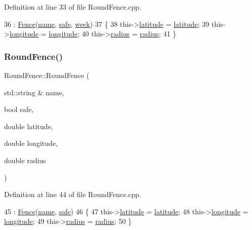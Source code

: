 Definition at line 33 of file Round\+Fence.\+cpp.


\begin{DoxyCode}
36         : \hyperlink{class_fence_a5c2be718e885ed9ae2ca048406d126b3}{Fence}(\hyperlink{class_fence_aa405676733f25812b38ea0dd9ccd1863}{name}, \hyperlink{class_fence_ad570430040eee657c625a67d5589c4b5}{safe}, \hyperlink{class_fence_ae589e973fa03316847aeceedd72e2b64}{week})
37 \{
38     this->\hyperlink{class_round_fence_ad48cb4c95dab320652679bae203b7caf}{latitude} = \hyperlink{class_round_fence_ad48cb4c95dab320652679bae203b7caf}{latitude};
39     this->\hyperlink{class_round_fence_a122cccc61f294c1fcdf7ebe944944fca}{longitude} = \hyperlink{class_round_fence_a122cccc61f294c1fcdf7ebe944944fca}{longitude};
40     this->\hyperlink{class_round_fence_a8e9d1a2f22df0bb718522f3ab6cd3b83}{radius} = \hyperlink{class_round_fence_a8e9d1a2f22df0bb718522f3ab6cd3b83}{radius};
41 \}
\end{DoxyCode}
\mbox{\label{class_round_fence_a99f4ab4cedbec39596633826e101f3d7}} 
\subsubsection{\texorpdfstring{Round\+Fence()}{RoundFence()}\hspace{0.1cm}{\footnotesize\ttfamily [2/3]}}
{\footnotesize\ttfamily Round\+Fence\+::\+Round\+Fence (\begin{DoxyParamCaption}\item[{std\+::string \&}]{name,  }\item[{bool}]{safe,  }\item[{double}]{latitude,  }\item[{double}]{longitude,  }\item[{double}]{radius }\end{DoxyParamCaption})}



Definition at line 44 of file Round\+Fence.\+cpp.


\begin{DoxyCode}
45         : \hyperlink{class_fence_a5c2be718e885ed9ae2ca048406d126b3}{Fence}(\hyperlink{class_fence_aa405676733f25812b38ea0dd9ccd1863}{name}, \hyperlink{class_fence_ad570430040eee657c625a67d5589c4b5}{safe})
46 \{
47     this->\hyperlink{class_round_fence_ad48cb4c95dab320652679bae203b7caf}{latitude} = \hyperlink{class_round_fence_ad48cb4c95dab320652679bae203b7caf}{latitude};
48     this->\hyperlink{class_round_fence_a122cccc61f294c1fcdf7ebe944944fca}{longitude} = \hyperlink{class_round_fence_a122cccc61f294c1fcdf7ebe944944fca}{longitude};
49     this->\hyperlink{class_round_fence_a8e9d1a2f22df0bb718522f3ab6cd3b83}{radius} = \hyperlink{class_round_fence_a8e9d1a2f22df0bb718522f3ab6cd3b83}{radius};
50 \}
\end{DoxyCode}
\mbox{\label{class_round_fence_ae2d9b747b35ee2c48587321e953b87df}} 
